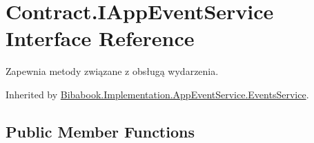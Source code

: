 \hypertarget{interface_contract_1_1_i_app_event_service}{}\section{Contract.\+I\+App\+Event\+Service Interface Reference}
\label{interface_contract_1_1_i_app_event_service}


Zapewnia metody związane z obsługą wydarzenia.  




Inherited by \hyperlink{class_bibabook_1_1_implementation_1_1_app_event_service_1_1_events_service}{Bibabook.\+Implementation.\+App\+Event\+Service.\+Events\+Service}.

\subsection*{Public Member Functions}
